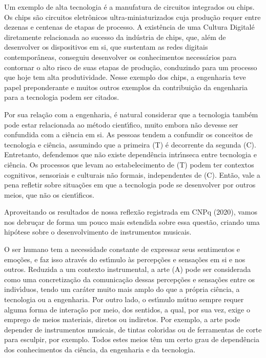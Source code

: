 \documentclass[
12pt,		%
openright,	%
twoside,  %
a4paper,			%
chapter=TITLE,		%
english,			%
french,				%
spanish,			%
brazil				%
]{USPSC-classe/USPSC}
\begin{document}
Um exemplo de alta tecnologia \'e a manufatura de circuitos integrados ou chips. Os chips s\~ao circuitos eletr\^onicos ultra-miniaturizados cuja produ\c{c}\~ao requer entre dezenas e centenas de etapas de processo. A exist\^encia de uma \textquotedbl Cultura Digital\textquotedbl  \'e diretamente relacionada ao sucesso da ind\'ustria de chips, que, al\'em de desenvolver os dispositivos em si, que sustentam as redes digitais contempor\^aneas, conseguiu desenvolver os conhecimentos necess\'arios para contornar o alto risco de suas etapas de produ\c{c}\~ao, conduzindo para um processo que hoje tem alta produtividade. Nesse exemplo dos chips, a engenharia teve papel preponderante e muitos outros exemplos da contribui\c{c}\~ao da engenharia para a tecnologia podem ser citados.








Por sua rela\c{c}\~ao com a engenharia, \'e natural considerar que a tecnologia tamb\'em pode estar relacionada ao m\'etodo cient\'{\i}fico, muito embora n\~ao devesse ser confundida com a ci\^encia em si. As pessoas tendem a confundir os conceitos de tecnologia e ci\^encia, assumindo que a primeira (T) \'e decorrente da segunda (C). Entretanto, defendemos que n\~ao existe depend\^encia intr\'{\i}nseca entre tecnologia e ci\^encia. Os processos que levam ao estabelecimento de (T) podem ter contextos cognitivos, sensoriais e culturais n\~ao formais, independentes de (C). Ent\~ao, vale a pena refletir sobre situa\c{c}\~oes em que a tecnologia pode se desenvolver por outros meios, que n\~ao os cient\'{\i}ficos.








Aproveitando os resultados de nossa reflex\~ao registrada em  CNPq (2020), vamos nos debru\c{c}ar de forma um pouco mais estendida sobre essa quest\~ao, criando uma hip\'otese sobre o desenvolvimento de instrumentos musicais.








O ser humano tem a necessidade constante de expressar seus sentimentos e emo\c{c}\~oes, e faz isso atrav\'es do est\'{\i}mulo \`as percep\c{c}\~oes e sensa\c{c}\~oes em si e nos outros. Reduzida a um contexto instrumental, a arte (A) pode ser considerada como uma concretiza\c{c}\~ao da comunica\c{c}\~ao dessas percep\c{c}\~oes e sensa\c{c}\~oes entre os indiv\'{\i}duos, tendo um car\'ater muito mais amplo do que a pr\'opria ci\^encia, a tecnologia ou a engenharia. Por outro lado, o est\'{\i}mulo m\'utuo sempre requer alguma forma de intera\c{c}\~ao por meio, dos sentidos, a qual, por sua vez, exige o emprego de meios materiais, diretos ou indiretos. Por exemplo, a arte pode depender de instrumentos musicais, de tintas coloridas ou de ferramentas de corte para esculpir, por exemplo. Todos estes meios t\^em um certo grau de depend\^encia dos conhecimentos da ci\^encia, da engenharia e da tecnologia.
\end{document}
